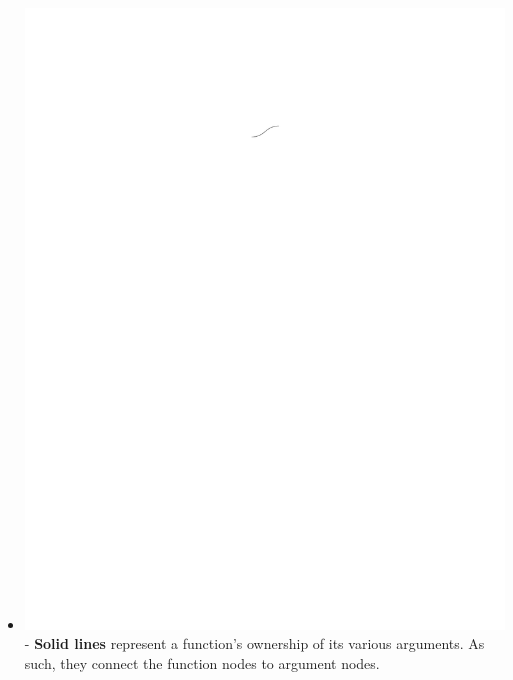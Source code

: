 \documentclass[conference]{IEEEtran}
\begin{document}
\begin{itemize}
		\item  \vspace{.25cm} \includegraphics{glossary-solidline} - \textbf{Solid
			lines} represent a function's ownership of its various arguments. As such,
		they connect the function nodes to argument nodes.
		

\end{itemize}
\end{document}
